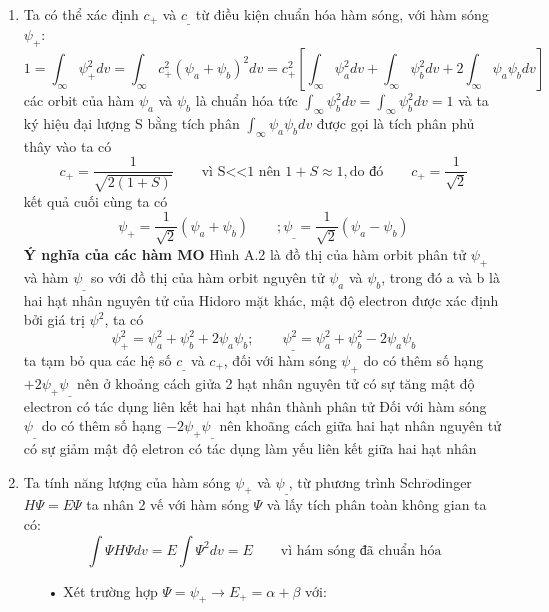 \begin{enumerate}
\item Ta có thể xác định $c_+$ và $c_\_$ từ điều kiện chuẩn hóa hàm sóng, với hàm sóng $\psi_+$:
\begin{equation}
1=\int_{\infty}\psi_+^2 dv=\int_{\infty}c_+^2\left(\psi_a +\psi_b\right)^2 dv=
c_+^2 \left[ \int_{\infty}\psi_a^2dv +  \int_{\infty}\psi_b^2dv + 2\int_{\infty}\psi_a \psi_b dv\right]
\end{equation}
các orbit của hàm $\psi_a$ và $\psi_b$ là chuẩn hóa tức $\int_{\infty}\psi_b^2dv=\int_{\infty}\psi_b^2dv=1$ và ta ký hiệu đại lượng S bằng tích phân $\int_{\infty}\psi_a \psi_bdv$ được gọi là tích phân phủ thây vào ta có
\begin{equation}
c_+ = \frac{1}{\sqrt{2(1+S)}} \qquad \text{vì S<<1 nên } 1+S\approx 1, \text{do đó} \qquad c_+=\frac{1}{\sqrt{2}}
\end{equation}
kết quả cuối cùng ta có
\begin{equation}
\psi_+=\frac{1}{\sqrt{2}}\left(\psi_a +\psi_b\right) \qquad ; \psi_{\_}=\frac{1}{\sqrt{2}}\left(\psi_a -\psi_b\right)
\end{equation}
\textbf{Ý nghĩa của các hàm MO}
Hình A.2 là đồ thị của hàm orbit phân tử $\psi_+$  và hàm $\psi_{\_}$ so với đồ thị của hàm orbit nguyên tử $\psi_a$ và $\psi_b$, trong đó a và b là hai hạt nhân nguyên tử của Hidoro
mặt khác, mật độ electron được xác định bởi giá trị $\psi^2$, ta có
\begin{equation}
\psi_+^2=\psi_a^2 +\psi_b^2 +2\psi_a \psi_b ;\qquad \psi_\_^2=\psi_a^2 +\psi_b^2 - 2\psi_a \psi_b
\end{equation}
ta tạm bỏ qua các hệ số $c_\_$ và $c_+$, đối với hàm sóng $\psi_+$ do có thêm số hạng $+2\psi_+\psi_\_$ nên ở khoảng cách giửa 2 hạt nhân nguyên tử có sự tăng mật độ electron có tác dụng liên kết hai hạt nhân thành phân tử
Đối với hàm sóng $\psi_\_$ do có thêm số hạng $-2\psi_+\psi_\_$ nên khoãng cách giữa hai hạt nhân nguyên tử có sự giảm mật độ eletron có tác dụng làm yếu liên kết giữa hai hạt nhân
\item Ta tính năng lượng của hàm sóng $\psi_+$ và $\psi_\_$, từ phương trình Schr$\ddot{o}$dinger $H\Psi=E\Psi$ ta nhân 2 vế với hàm sóng $\Psi$ và lấy tích phân toàn không gian ta có:
\begin{equation}
 \int\Psi H \Psi dv =E\int \Psi^2 dv=E \qquad \text{vì hám sóng đã chuẩn hóa}
\end{equation}
\begin{itemize}
\item[•] Xét trường hợp $\Psi =\psi_+ \rightarrow E_+=\alpha + \beta$ với:\\

\end{itemize}
\end{enumerate}
